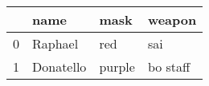 \begin{tabular}{llll}
\toprule
{} &       name &    mask &    weapon \\
\midrule
0 &    Raphael &     red &       sai \\
1 &  Donatello &  purple &  bo staff \\
\bottomrule
\end{tabular}
